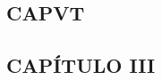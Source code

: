 \documentclass{article}
\begin{document}
\begin{paracol}{2} %
  \begin{nthcolumn*}{0} %
    \subsection*{\centering CAPVT }
    \subsection*{\centering } 
  \end{nthcolumn*}
  \vspace{0.5cm}
  \begin{nthcolumn}{1} %
    \subsection*{\centering CAPÍTULO III}

\end{nthcolumn}
\end{paracol}
\end{document}
